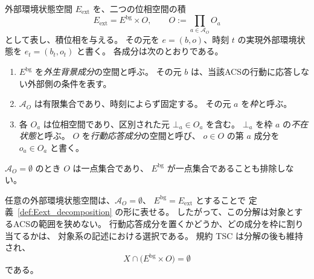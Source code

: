 \begin{definition}[外部環境状態空間の分解]
\label{def:Eext_decomposition}
外部環境状態空間 $E_{\mathrm{ext}}$ を、二つの位相空間の積
\[
  E_{\mathrm{ext}}
  =
  E^{\mathrm{bg}}\times O,
  \qquad
  O
  :=
  \prod_{a\in\mathcal A_O} O_a
\]
として表し、積位相を与える。
その元を $e=(b,o)$、時刻 $t$ の実現外部環境状態を
$e_t=(b_t,o_t)$ と書く。
各成分は次のとおりである。
\begin{enumerate}[label=(\roman*)]
  \item $E^{\mathrm{bg}}$ を\emph{外生背景成分}の空間と呼ぶ。
  その元 $b$ は、当該ACSの行動に応答しない外部側の条件を表す。
  \item $\mathcal A_O$ は有限集合であり、時刻によらず固定する。
  その元 $a$ を\emph{枠}と呼ぶ。
  \item 各 $O_a$ は位相空間であり、区別された元 $\bot_a\in O_a$ を含む。
  $\bot_a$ を枠 $a$ の\emph{不在状態}と呼ぶ。
  $O$ を\emph{行動応答成分}の空間と呼び、
  $o\in O$ の第 $a$ 成分を $o_a\in O_a$ と書く。
\end{enumerate}
$\mathcal A_O=\emptyset$ のとき $O$ は一点集合であり、
$E^{\mathrm{bg}}$ が一点集合であることも排除しない。
\end{definition}

任意の外部環境状態空間は、$\mathcal A_O=\emptyset$、
$E^{\mathrm{bg}}=E_{\mathrm{ext}}$ とすることで
定義~\ref{def:Eext_decomposition} の形に表せる。
したがって、この分解は対象とするACSの範囲を狭めない。
行動応答成分を置くかどうか、どの成分を枠に割り当てるかは、
対象系の記述における選択である。
規約 TSC は分解の後も維持され、
\[
  X\cap\bigl(E^{\mathrm{bg}}\times O\bigr)=\emptyset
\]
である。

